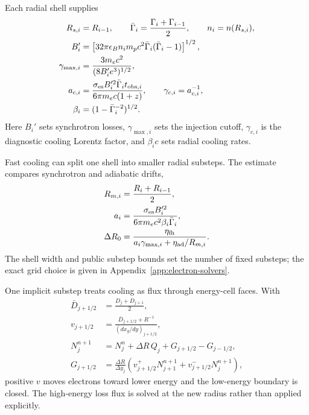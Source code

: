 \documentclass[twocolumn]{aastex702}
\begin{document}
Each radial shell supplies
\begin{equation}
\begin{aligned}
R_{s,i}&=R_{i-1},\qquad
\bar\Gamma_i=\frac{\Gamma_i+\Gamma_{i-1}}{2},\qquad
n_i=n(R_{s,i}),\\
B_i'&=\left[32\pi\epsilon_B n_i m_pc^2
\bar\Gamma_i(\bar\Gamma_i-1)\right]^{1/2},\\
\gamma_{\max,i}&=\frac{3m_ec^2}{(8B_i'e^3)^{1/2}},\\
a_{c,i}&=\frac{\sigma_{\rm es}B_i'^2\bar\Gamma_i t_{{\rm obs},i}}
{6\pi m_ec(1+z)},\qquad
\gamma_{c,i}=a_{c,i}^{-1},\\
\beta_i&=(1-\bar\Gamma_i^{-2})^{1/2}.
\end{aligned}
\end{equation}
Here \(B_i'\) sets synchrotron losses, \(\gamma_{\max,i}\) sets the injection
cutoff, \(\gamma_{c,i}\) is the diagnostic cooling Lorentz factor, and
\(\beta_i c\) sets radial cooling rates.

Fast cooling can split one shell into smaller radial substeps.  The estimate
compares synchrotron and adiabatic drifts,
\begin{equation}
\begin{aligned}
R_{m,i}&=\frac{R_i+R_{i-1}}{2},\\
a_i&=\frac{\sigma_{\rm es}B_i'^2}
{6\pi m_ec^2\beta_i\bar\Gamma_i},\\
\Delta R_0&=\frac{\eta_{\rm fh}}
{a_i\gamma_{\max,i}+\eta_{\rm ad}/R_{m,i}} .
\end{aligned}
\end{equation}
The shell width and public substep bounds set the number of fixed substeps; the
exact grid choice is given in Appendix~\ref{app:electron-solvers}.

One implicit substep treats cooling as flux through energy-cell faces.  With
\begin{equation}
\begin{aligned}
\bar D_{j+1/2}&=\frac{D_j+D_{j+1}}{2},\\
v_{j+1/2}&=
\frac{\bar D_{j+1/2}+R^{-1}}
{(dx_g/dy)_{j+1/2}},\\
N_j^{n+1}&=N_j^n+\Delta R\,Q_j
+G_{j+1/2}-G_{j-1/2},\\
G_{j+1/2}&=\frac{\Delta R}{\Delta y_j}
\left(v_{j+1/2}^{+}N_{j+1}^{n+1}
+v_{j+1/2}^{-}N_j^{n+1}\right),
\end{aligned}
\end{equation}
positive \(v\) moves electrons toward lower energy and the low-energy boundary
is closed.  The high-energy loss flux is solved at the new radius rather than
applied explicitly.
\end{document}
